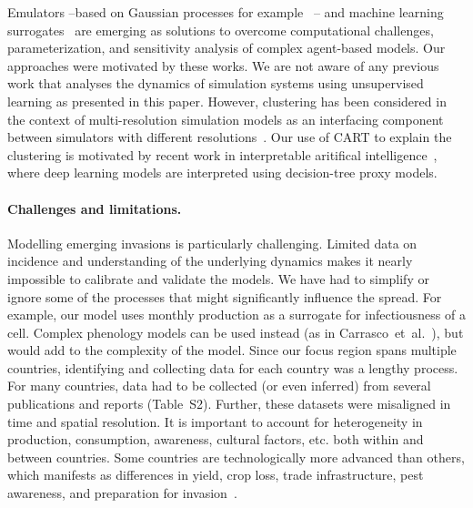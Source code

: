 \documentclass[11pt]{article}
\theoremstyle{definition}
\begin{document}
Emulators --based on Gaussian processes for
example~\cite{fadikar2018calibrating} -- and machine learning
surrogates~\cite{lamperti2018agent} are emerging as solutions to overcome
computational challenges, parameterization, and sensitivity analysis of
complex agent-based models. Our approaches were
motivated by these works. We are not aware of any previous
work that analyses the dynamics of simulation systems using unsupervised
learning as presented in this paper. However, clustering has been considered
in the context of multi-resolution simulation models as an interfacing
component between simulators with different
resolutions~\cite{cassandras2000clustering}. Our use of CART to explain the
clustering is motivated by recent work in interpretable aritifical
intelligence~\cite{guidotti2019survey}, where deep learning models are
interpreted using decision-tree proxy models. 


\paragraph{Challenges and limitations.} Modelling emerging invasions is
particularly challenging. Limited data on incidence and understanding of
the underlying dynamics makes it nearly impossible to calibrate and
validate the models.   We have had to simplify or ignore some of the
processes that might significantly influence the spread.  For example, our
model uses monthly production as a surrogate for infectiousness of a cell.
Complex phenology models can be used instead (as in
Carrasco~et~al.~\cite{carrasco2010unveiling}), but would add to the
complexity of the model.
Since our focus region spans multiple countries, identifying and collecting
data for each country was a lengthy process. For many countries, data had
to be collected (or even inferred) from several publications and reports
(Table~S2). Further, these datasets were misaligned in
time and spatial resolution.  It is important to account for heterogeneity
in production, consumption, awareness, cultural factors, etc. both within
and between countries.  Some countries are technologically more advanced
than others, which manifests as differences in yield, crop loss, trade
infrastructure, pest awareness, and preparation for
invasion~\cite{early2016global}.
\end{document}
